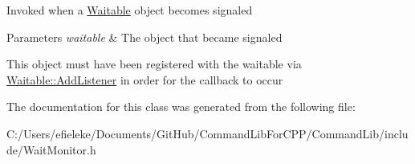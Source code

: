 Invoked when a \mbox{\hyperlink{class_command_lib_1_1_waitable}{Waitable}} object becomes signaled


\begin{DoxyParams}{Parameters}
{\em waitable} & The object that became signaled\\
\hline
\end{DoxyParams}


This object must have been registered with the waitable via \mbox{\hyperlink{class_command_lib_1_1_waitable_afa4d25c0eb13db4222575f95036fbb22}{Waitable\+::\+Add\+Listener}} in order for the callback to occur 

The documentation for this class was generated from the following file\+:\begin{DoxyCompactItemize}
\item 
C\+:/\+Users/efieleke/\+Documents/\+Git\+Hub/\+Command\+Lib\+For\+C\+P\+P/\+Command\+Lib/include/Wait\+Monitor.\+h\end{DoxyCompactItemize}
